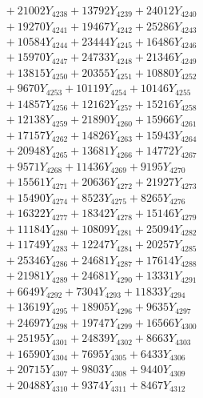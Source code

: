 \documentclass[a4paper,10pt]{article}
\begin{document}
{\begin{align}
&\;  + 21002 Y_{4238} + 13792 Y_{4239} + 24012 Y_{4240} \\[0.3ex]
&\;  + 19270 Y_{4241} + 19467 Y_{4242} + 25286 Y_{4243} \\[0.3ex]
&\;  + 10584 Y_{4244} + 23444 Y_{4245} + 16486 Y_{4246} \\[0.3ex]
&\;  + 15970 Y_{4247} + 24733 Y_{4248} + 21346 Y_{4249} \\[0.3ex]
&\;  + 13815 Y_{4250} + 20355 Y_{4251} + 10880 Y_{4252} \\[0.3ex]
&\;  + 9670 Y_{4253} + 10119 Y_{4254} + 10146 Y_{4255} \\[0.3ex]
&\;  + 14857 Y_{4256} + 12162 Y_{4257} + 15216 Y_{4258} \\[0.5ex]\allowbreak
&\;  + 12138 Y_{4259} + 21890 Y_{4260} + 15966 Y_{4261} \\[0.3ex]
&\;  + 17157 Y_{4262} + 14826 Y_{4263} + 15943 Y_{4264} \\[0.3ex]
&\;  + 20948 Y_{4265} + 13681 Y_{4266} + 14772 Y_{4267} \\[0.3ex]
&\;  + 9571 Y_{4268} + 11436 Y_{4269} + 9195 Y_{4270} \\[0.3ex]
&\;  + 15561 Y_{4271} + 20636 Y_{4272} + 21927 Y_{4273} \\[0.3ex]
&\;  + 15490 Y_{4274} + 8523 Y_{4275} + 8265 Y_{4276} \\[0.3ex]
&\;  + 16322 Y_{4277} + 18342 Y_{4278} + 15146 Y_{4279} \\[0.3ex]
&\;  + 11184 Y_{4280} + 10809 Y_{4281} + 25094 Y_{4282} \\[0.3ex]
&\;  + 11749 Y_{4283} + 12247 Y_{4284} + 20257 Y_{4285} \\[0.3ex]
&\;  + 25346 Y_{4286} + 24681 Y_{4287} + 17614 Y_{4288} \\[0.5ex]\allowbreak
&\;  + 21981 Y_{4289} + 24681 Y_{4290} + 13331 Y_{4291} \\[0.3ex]
&\;  + 6649 Y_{4292} + 7304 Y_{4293} + 11833 Y_{4294} \\[0.3ex]
&\;  + 13619 Y_{4295} + 18905 Y_{4296} + 9635 Y_{4297} \\[0.3ex]
&\;  + 24697 Y_{4298} + 19747 Y_{4299} + 16566 Y_{4300} \\[0.3ex]
&\;  + 25195 Y_{4301} + 24839 Y_{4302} + 8663 Y_{4303} \\[0.3ex]
&\;  + 16590 Y_{4304} + 7695 Y_{4305} + 6433 Y_{4306} \\[0.3ex]
&\;  + 20715 Y_{4307} + 9803 Y_{4308} + 9440 Y_{4309} \\[0.3ex]
&\;  + 20488 Y_{4310} + 9374 Y_{4311} + 8467 Y_{4312} \\[0.3ex]

\end{align}}
\end{document}
